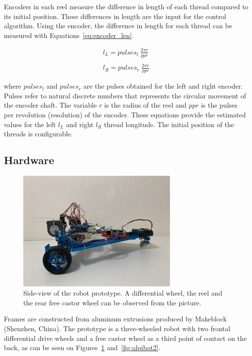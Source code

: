 \documentclass[journal]{IEEEtran}
\begin{document}
Encoders in each reel measure the difference in length of each thread compared to its initial position. These differences in length are the input for the control algorithm.  Using the encoder, the difference in length for each thread can be measured with Equations~\ref{eq:encoder_len}.

\begin{equation}
\label{eq:encoder_len}
\begin{array}{ll}  
l_L = pulses_{l} \; \frac{2\pi r}{ppr}  \\
\\
l_R = pulses_{r} \; \frac{2\pi r}{ppr}
\end{array}
\end{equation}{}

\noindent where $pulses_{l}$ and $pulses_{r}$ are the pulses obtained for the left and right encoder.  Pulses refer to natural discrete numbers that represents the circular movement of the encoder shaft.  The variable $r$ is the radius of the reel and $ppr$ is the pulses per revolution (resolution) of the encoder. These equations provide the estimated values for the left $l_L$ and right $l_R$  thread longitude.   The initial position of the threads is configurable.

\subsection{Hardware}

\begin{figure}[h!]
\centering
\includegraphics[width=8cm]{images/alpibot1.jpg}
\caption{Side-view of the robot prototype.  A differential wheel, the reel and the rear free castor wheel can be observed from the picture.}
\label{fig:alpibot1}
\end{figure}


Frames are constructed from aluminum extrusions produced by Makeblock (Shenzhen, China).   The prototype is a three-wheeled robot with two frontal differential drive wheels and a free castor wheel as a third point of contact on the back, as can be seen on Figures~\ref{fig:alpibot1} and~\ref{fig:alpibot2}.  
\end{document}

